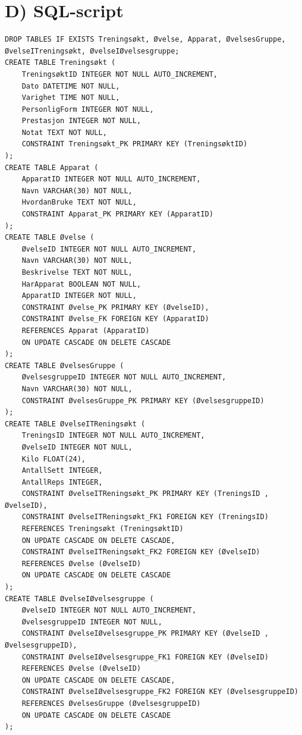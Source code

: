 \documentclass[11pt]{article}
\begin{document}
\section*{D) SQL-script}
\label{sec:org3b34255}
\begin{verbatim}
DROP TABLES IF EXISTS Treningsøkt, Øvelse, Apparat, ØvelsesGruppe,
ØvelseITreningsøkt, ØvelseIØvelsesgruppe;
CREATE TABLE Treningsøkt (
    TreningsøktID INTEGER NOT NULL AUTO_INCREMENT,
    Dato DATETIME NOT NULL,
    Varighet TIME NOT NULL,
    PersonligForm INTEGER NOT NULL,
    Prestasjon INTEGER NOT NULL,
    Notat TEXT NOT NULL,
    CONSTRAINT Treningsøkt_PK PRIMARY KEY (TreningsøktID)
);
CREATE TABLE Apparat (
    ApparatID INTEGER NOT NULL AUTO_INCREMENT,
    Navn VARCHAR(30) NOT NULL,
    HvordanBruke TEXT NOT NULL,
    CONSTRAINT Apparat_PK PRIMARY KEY (ApparatID)
);
CREATE TABLE Øvelse (
    ØvelseID INTEGER NOT NULL AUTO_INCREMENT,
    Navn VARCHAR(30) NOT NULL,
    Beskrivelse TEXT NOT NULL,
    HarApparat BOOLEAN NOT NULL,
    ApparatID INTEGER NOT NULL,
    CONSTRAINT Øvelse_PK PRIMARY KEY (ØvelseID),
    CONSTRAINT Øvelse_FK FOREIGN KEY (ApparatID)
	REFERENCES Apparat (ApparatID)
	ON UPDATE CASCADE ON DELETE CASCADE
);
CREATE TABLE ØvelsesGruppe (
    ØvelsesgruppeID INTEGER NOT NULL AUTO_INCREMENT,
    Navn VARCHAR(30) NOT NULL,
    CONSTRAINT ØvelsesGruppe_PK PRIMARY KEY (ØvelsesgruppeID)
);
CREATE TABLE ØvelseITReningsøkt (
    TreningsID INTEGER NOT NULL AUTO_INCREMENT,
    ØvelseID INTEGER NOT NULL,
    Kilo FLOAT(24),
    AntallSett INTEGER,
    AntallReps INTEGER,
    CONSTRAINT ØvelseITReningsøkt_PK PRIMARY KEY (TreningsID , ØvelseID),
    CONSTRAINT ØvelseITReningsøkt_FK1 FOREIGN KEY (TreningsID)
	REFERENCES Treningsøkt (TreningsøktID)
	ON UPDATE CASCADE ON DELETE CASCADE,
    CONSTRAINT ØvelseITReningsøkt_FK2 FOREIGN KEY (ØvelseID)
	REFERENCES Øvelse (ØvelseID)
	ON UPDATE CASCADE ON DELETE CASCADE
);
CREATE TABLE ØvelseIØvelsesgruppe (
    ØvelseID INTEGER NOT NULL AUTO_INCREMENT,
    ØvelsesgruppeID INTEGER NOT NULL,
    CONSTRAINT ØvelseIØvelsesgruppe_PK PRIMARY KEY (ØvelseID , ØvelsesgruppeID),
    CONSTRAINT ØvelseIØvelsesgruppe_FK1 FOREIGN KEY (ØvelseID)
	REFERENCES Øvelse (ØvelseID)
	ON UPDATE CASCADE ON DELETE CASCADE,
    CONSTRAINT ØvelseIØvelsesgruppe_FK2 FOREIGN KEY (ØvelsesgruppeID)
	REFERENCES ØvelsesGruppe (ØvelsesgruppeID)
	ON UPDATE CASCADE ON DELETE CASCADE
);
\end{verbatim}
\end{document}
